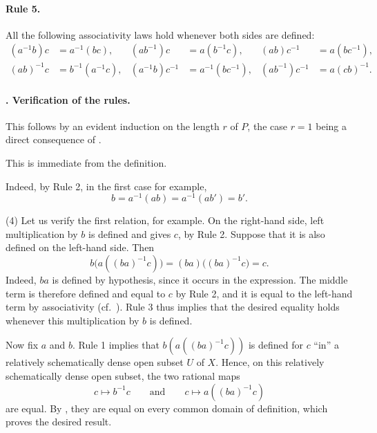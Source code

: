 \paragraph{Rule 5.}
All the following associativity laws hold whenever both sides are
defined:
\[
\begin{aligned}
  (a^{-1}b)c&=a^{-1}(bc),&
  (ab^{-1})c&=a(b^{-1}c),&
  (ab)c^{-1}&=a(bc^{-1}),\\
  (ab)^{-1}c&=b^{-1}(a^{-1}c),&
  (a^{-1}b)c^{-1}&=a^{-1}(bc^{-1}),&
  (ab^{-1})c^{-1}&=a(cb)^{-1}.
\end{aligned}
\]

\paragraph{.
Verification of the rules.}
\textup{} This follows by an evident induction on the length
\(r\) of \(P\), the case \(r=1\) being a direct consequence of
.

\textup{} This is immediate from the definition.

\textup{} Indeed, by Rule 2, in the first case for example,
\[
  b=a^{-1}(ab)=a^{-1}(ab')=b'.
\]

\textup{(4)} Let us verify the first relation, for example. On the
right-hand side, left multiplication by \(b\) is defined and gives
\(c\), by Rule 2. Suppose that it is also defined on the
left-hand side. Then
\[
  b\bigl(a((ba)^{-1}c)\bigr)
  =(ba)\bigl((ba)^{-1}c\bigr)
  =c.
\]
Indeed, \(ba\) is defined by hypothesis, since it occurs in the
expression. The middle term is therefore defined and equal to
\(c\) by Rule 2, and it is equal to the left-hand term by
associativity (cf.\ ). Rule 3 thus implies that the desired
equality holds whenever this multiplication by \(b\) is defined.

Now fix \(a\) and \(b\). Rule 1 implies that
\(b(a((ba)^{-1}c))\) is defined for \(c\) ``in'' a relatively
schematically dense open subset \(U\) of \(X\). Hence, on this
relatively schematically dense open subset, the two rational maps
\[
  c\longmapsto b^{-1}c
  \qquad\text{and}\qquad
  c\longmapsto a((ba)^{-1}c)
\]
are equal. By , they are equal on every common domain of
definition, which proves the desired result.

